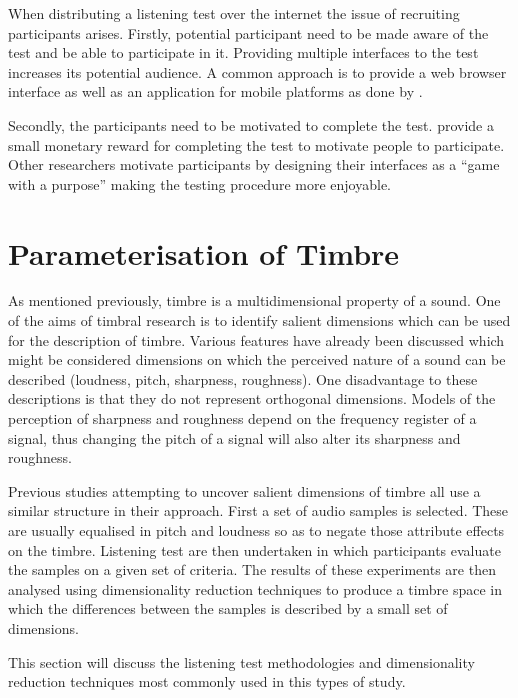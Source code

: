 		When distributing a listening test over the internet the issue of recruiting participants arises. Firstly,
		potential participant need to be made aware of the test and be able to participate in it. Providing multiple
		interfaces to the test increases its potential audience. A common approach is to provide a web browser
		interface as well as an application for mobile platforms as done by \citet{huq2010crowdsourcing}.

		Secondly, the participants need to be motivated to complete the test. \citet{cartwright2013socialeq} provide
		a small monetary reward for completing the test to motivate people to participate. Other researchers
		motivate participants by designing their interfaces as a ``game with a purpose'' \citep{law2007tagatune,
		huq2010crowdsourcing, burgoyne2013hooked} making the testing procedure more enjoyable.

\section{Parameterisation of Timbre}
\label{sec:Timbre-Parameterisation}
	As mentioned previously, timbre is a multidimensional property of a sound. One of the aims of timbral research is to
	identify salient dimensions which can be used for the description of timbre. Various features have already been
	discussed which might be considered dimensions on which the perceived nature of a sound can be described (loudness,
	pitch, sharpness, roughness). One disadvantage to these descriptions is that they do not represent orthogonal
	dimensions. Models of the perception of sharpness and roughness depend on the frequency register of a signal, thus
	changing the pitch of a signal will also alter its sharpness and roughness.

	Previous studies attempting to uncover salient dimensions of timbre all use a similar structure in their approach.
	First a set of audio samples is selected. These are usually equalised in pitch and loudness so as to negate those
	attribute effects on the timbre. Listening test are then undertaken in which participants evaluate the samples on a
	given set of criteria. The results of these experiments are then analysed using dimensionality reduction techniques
	to produce a timbre space in which the differences between the samples is described by a small set of dimensions.

	This section will discuss the listening test methodologies and dimensionality reduction techniques most commonly
	used in this types of study.

